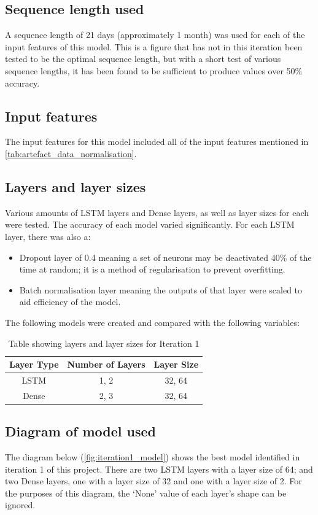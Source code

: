 \subsection{Sequence length used}
A sequence length of 21 days (approximately 1 month) was used for each of the input features of this model.
This is a figure that has not in this iteration been tested to be the optimal sequence length, but with a short
test of various sequence lengths, it has been found to be sufficient to produce values over 50\% accuracy.
\subsection{Input features}
The input features for this model included all of the input features mentioned in \autoref{tab:artefact_data_normalisation}.

\subsection{Layers and layer sizes} \label{ssec:iteration1layers}
Various amounts of LSTM layers and Dense layers, as well as layer sizes for each were tested. The accuracy of each model varied
significantly. For each LSTM layer, there was also a:
\begin{itemize}
    \item Dropout layer of 0.4 meaning a set of neurons may be
    deactivated 40\% of the time at random; it is a method of regularisation to prevent overfitting.
    \item Batch normalisation layer meaning the outputs of that layer were scaled to aid efficiency of the model.
\end{itemize}
The following models were created and compared with the following variables:

\begin{table}[ht]
    \centering
    \begin{tabular}{|c|c|c|}
        \hline
        Layer Type & Number of Layers & Layer Size \\
        \hline\hline
        LSTM & 1, 2 & 32, 64 \\
        Dense & 2, 3 & 32, 64 \\
        \hline
    \end{tabular}
    \caption{Table showing layers and layer sizes for Iteration 1}
    \label{tab:iteration1_layers}
\end{table}
\FloatBarrier

\subsection{Diagram of model used}
The diagram below (\autoref{fig:iteration1_model}) shows the best model identified in iteration 1 of this project.
There are two LSTM layers with a layer size of 64; and two Dense layers, one with a layer size of 32 and one with
a layer size of 2. For the purposes of this diagram, the `None' value of each layer's shape can be ignored.

